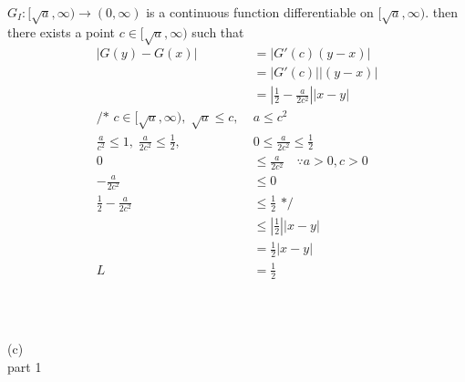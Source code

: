 \documentclass[12pt, border = 4pt, multi]{article} %
\begin{document}
\\
$G_I: [\sqrt{a}, \infty) \rightarrow (0, \infty)$ is a continuous function differentiable on $[\sqrt{a}, \infty)$. then there exists a point $c \in [\sqrt{a}, \infty)$ such that
\begin{align*}
|G(y) - G(x)| &= |G'(c)(y - x)|\\
&= |G'(c)||(y - x)|\\
&= \left|\frac{1}{2} - \frac{a}{2c ^ 2}\right||x - y|\\
\text{/* } c \in [\sqrt{a}, \infty),\; \sqrt{a} \leq c,\; &a \leq c ^ 2\\
\frac{a}{c ^ 2} \leq 1,\; \frac{a}{2c ^ 2} \leq \frac{1}{2},\; &0 \leq \frac{a}{2c ^ 2} \leq \frac{1}{2}\\
0 &\leq \frac{a}{2c ^ 2} \quad \because a > 0, c > 0\\
-\frac{a}{2c ^ 2} &\leq 0\\
\frac{1}{2} -\frac{a}{2c ^ 2} &\leq \frac{1}{2} \text{ */}\\
&\leq \left|\frac{1}{2}\right||x - y|\\
&= \frac{1}{2}|x - y|\\
L &= \frac{1}{2}\\
\end{align*}
\\
\\
\\
(c)\\
part 1
\end{document}

